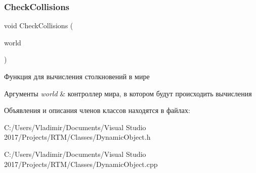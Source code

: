 \subsubsection{\texorpdfstring{Check\+Collisions}{CheckCollisions}}
{\footnotesize\ttfamily void Check\+Collisions (\begin{DoxyParamCaption}\item[{\hyperlink{classrtm_1_1_world_controller}{World\+Controller} $\ast$const}]{world }\end{DoxyParamCaption})\hspace{0.3cm}{\ttfamily [friend]}}



Функция для вычисления столкновений в мире 


\begin{DoxyParams}{Аргументы}
{\em world} & контроллер мира, в котором будут происходить вычисления \\
\hline
\end{DoxyParams}


Объявления и описания членов классов находятся в файлах\+:\begin{DoxyCompactItemize}
\item 
C\+:/\+Users/\+Vladimir/\+Documents/\+Visual Studio 2017/\+Projects/\+R\+T\+M/\+Classes/Dynamic\+Object.\+h\item 
C\+:/\+Users/\+Vladimir/\+Documents/\+Visual Studio 2017/\+Projects/\+R\+T\+M/\+Classes/Dynamic\+Object.\+cpp\end{DoxyCompactItemize}
